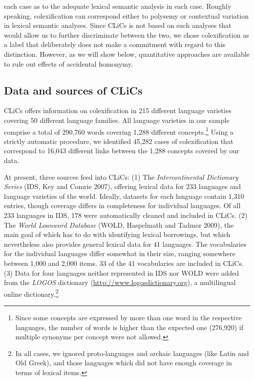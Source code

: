 each case as to the adequate lexical semantic analysis in each case.
Roughly speaking,
colexification can correspond either to polysemy or contextual variation in lexical semantic analyses.
Since CLiCs is not based on such analyses that would allow us to further discriminate between the
two, we chose colexification as a label that deliberately does not make a commitment with regard to
this distinction. However, as we will show below, quantitative approaches are available to rule out effects of accidental homonymy. 

\subsection{Data and sources of CLiCs}
CLiCs offers information on colexification in 215 different language varieties
covering 50 different language families. All language varieties in our sample comprise a total of
290,760 words covering 1,288 different concepts.\footnote{Since some concepts are expressed by more
than one word in the respective languages, the number of words is higher than the expected one
(276,920) if
multiple synonyms per concept were not allowed.} Using a strictly automatic procedure, we identified
45,282 cases of colexification that correspond to 16,043 different links between the 1,288 concepts
covered by our data. 

At present, three sources feed into CLiCs: (1) The \emph{Intercontinental Dictionary Series} (IDS, Key and
Comrie 2007), offering lexical data for 233 languages and language varieties of the world. Ideally,
datasets for each language contain 1,310 entries, though coverage differs in completeness for
individual languages. Of all 233 languages in IDS, 178 were automatically cleaned and included in
CLiCs. (2) The \emph{World Loanword Database} (WOLD, Haspelmath and Tadmor 2009), the main goal of which
has to do with identifying lexical borrowings, but which nevertheless also provides general lexical
data for 41 languages. The vocabularies for the individual languages differ somewhat in their size,
ranging somewhere between 1,000 and 2,000 items. 33 of the 41 vocabularies are included in CLiCs.
(3) Data for four languages neither represented in IDS nor WOLD were added from the \emph{LOGOS} dictionary
(\url{http://www.logosdictionary.org}), a multilingual online dictionary.\footnote{In all cases, we ignored proto-languages and
archaic languages (like Latin and Old Greek), and those languages which
did not have enough coverage in terms of lexical items.}
